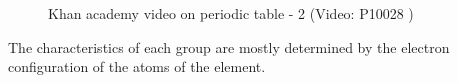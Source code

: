         \par 
        \label{m38757*eip-6}
    \setcounter{subfigure}{0}
	\begin{figure}[H] %
    \textnormal{Khan academy video on periodic table - 2}\vspace{.1in} \nopagebreak
  \label{m38757*yt-media3}\label{m38757*yt-video3}
             { (Video:  P10028 )}
      \vspace{2pt}
    \vspace{.1in}
 \end{figure}       \par 
        \label{m38757*id261577}The characteristics of each group are mostly determined by the electron configuration of the atoms of the element.\par 
